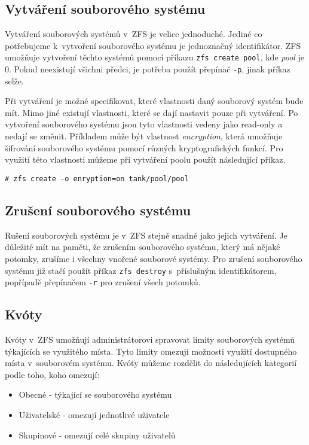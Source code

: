 \subsection{Vytváření souborového systému}
\label{createfs}
Vytváření souborových systémů v~ZFS je velice jednoduché. Jediné co potřebujeme k~vytvoření souborového systému je jednoznačný identifikátor. ZFS umožňuje vytvoření těchto systémů pomocí příkazu \verb|zfs create pool|, kde \emph{pool} je 0. Pokud neexistují všichni předci, je potřeba použít přepínač \verb|-p|, jinak příkaz selže.

Při vytváření je možné specifikovat, které vlastnosti daný souborový systém bude mít. Mimo jiné existují vlastnosti, které se dají nastavit pouze při vytváření. Po vytvoření souborového systému jsou tyto vlastnosti vedeny jako read-only a nedají se změnit. Příkladem může být vlastnost \emph{encryption}, která umožňuje šifrování souborového systému pomocí různých kryptografických funkcí. Pro využití této vlastnosti můžeme při vytváření poolu použít následující příkaz.
\begin{verbatim}
# zfs create -o enryption=on tank/pool/pool
\end{verbatim}
\subsection{Zrušení souborového systému}
Rušení souborových systému je v~ZFS stejně snadné jako jejich vytváření. Je důležité mít na paměti, že zrušením souborového systému, který má nějaké potomky, zrušíme i všechny vnořené souborové systémy. Pro zrušení souborového systému již stačí použít příkaz \verb|zfs destroy| s~příslušným identifikátorem, popřípadě přepínačem \verb|-r| pro zrušení všech potomků.
\subsection{Kvóty}
\label{quota}

Kvóty v~ZFS umožňují administrátorovi spravovat limity souborových systémů týkajících se využitého místa. Tyto limity omezují možnosti využití dostupného místa v~souborovém systému. Kvóty můžeme rozdělit do následujících kategorií podle toho, koho omezují:
\begin{itemize}
  \item Obecné - týkající se souborového systému
  \item Uživatelské - omezují jednotlivé uživatele
  \item Skupinové - omezují celé skupiny uživatelů
\end{itemize}

